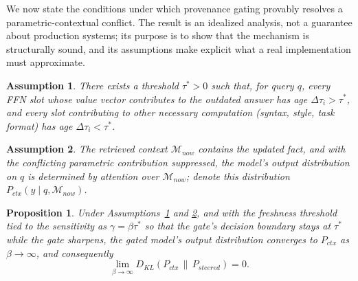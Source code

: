 \documentclass[10pt]{article}
\newtheorem{proposition}{Proposition}
\newtheorem{assumption}{Assumption}
\begin{document}
We now state the conditions under which provenance gating provably resolves a parametric-contextual conflict. The result is an idealized analysis, not a guarantee about production systems; its purpose is to show that the mechanism is structurally sound, and its assumptions make explicit what a real implementation must approximate.

\begin{assumption}
\label{as:stale_support}
There exists a threshold $\tau^{\ast} > 0$ such that, for query $q$, every FFN slot whose value vector contributes to the outdated answer has age $\Delta\tau_i > \tau^{\ast}$, and every slot contributing to other necessary computation (syntax, style, task format) has age $\Delta\tau_i < \tau^{\ast}$.
\end{assumption}

\begin{assumption}
\label{as:context_sufficiency}
The retrieved context $\mathcal{M}_{now}$ contains the updated fact, and with the conflicting parametric contribution suppressed, the model's output distribution on $q$ is determined by attention over $\mathcal{M}_{now}$; denote this distribution $P_{ctx}(y \mid q, \mathcal{M}_{now})$.
\end{assumption}

\begin{proposition}
\label{prop:consistency}
Under Assumptions~\ref{as:stale_support} and \ref{as:context_sufficiency}, and with the freshness threshold tied to the sensitivity as $\gamma = \beta\tau^{\ast}$ so that the gate's decision boundary stays at $\tau^{\ast}$ while the gate sharpens, the gated model's output distribution converges to $P_{ctx}$ as $\beta \to \infty$, and consequently
\begin{equation}
  \lim_{\beta \to \infty} D_{KL}\!\left( P_{ctx} \,\|\, P_{steered} \right) = 0.
\end{equation}
\end{proposition}
\end{document}
